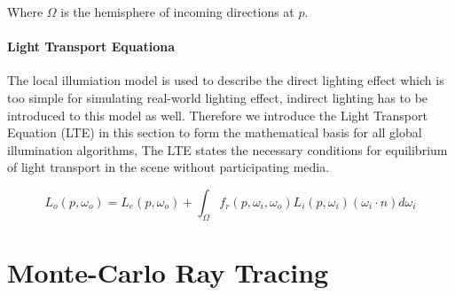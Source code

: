 Where \(\Omega\) is the hemisphere of incoming directions at \(p\).

\paragraph{Light Transport Equationa} 

The local illumiation model is used to describe the direct lighting effect which is too simple for simulating real-world lighting effect, indirect lighting has to be introduced to this model as well. Therefore we introduce the Light Transport Equation (LTE) in this section to form the mathematical basis for all global illumination algorithms, The LTE states the necessary conditions for equilibrium of light transport in the scene without participating media. 

\begin{equation}
L_{o}(p, \omega_{o}) = L_{e}(p, \omega_{o}) + \int_{\Omega}f_{r}(p, \omega_{i}, \omega_{o})L_{i}(p, \omega_{i})(\omega_{i} \cdot n)d\omega_{i}
\label{eq:lte}
\end{equation}


\section{Monte-Carlo Ray Tracing} 


